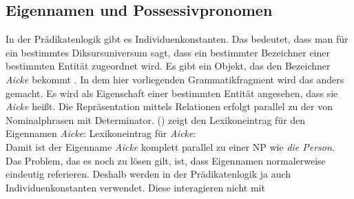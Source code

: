 \subsection{Eigennamen und Possessivpronomen}

In der Prädikatenlogik gibt es Individuenkonstanten. Das bedeutet, dass man für ein bestimmtes
Diksursuniversum sagt, dass ein bestimmter Bezeichner einer bestimmten Entität zugeordnet wird. Es
gibt ein Objekt, das den Bezeichner \emph{Aicke} bekommt \citep[68]{AAD73a}. In dem hier
vorliegenden Grammatikfragment wird das anders gemacht. Es wird als Eigenschaft einer bestimmten Entität
angesehen, dass sie \emph{Aicke} heißt. Die Repräsentation mittels Relationen erfolgt
parallel zu der von Nominalphrasen mit Determinator. () zeigt den Lexikoneintrag für den
Eigennamen \emph{Aicke}:
\eas
\label{le-Aicke-1}%
Lexikoneintrag für \emph{Aicke}:\\
\zs
Damit ist der Eigenname \emph{Aicke} komplett parallel zu einer NP wie \emph{die Person}. Das
Problem, das es noch zu lösen gilt, ist, dass Eigennamen normalerweise eindeutig referieren. Deshalb
werden in der Prädikatenlogik ja auch Individuenkonstanten verwendet. Diese interagieren nicht mit
